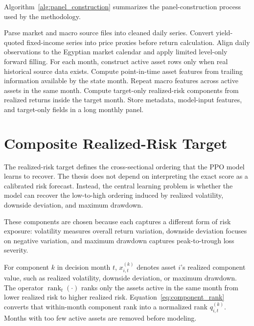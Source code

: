 Algorithm~\ref{alg:panel_construction} summarizes the panel-construction process used by the methodology.

\begin{algorithm}[H]
\caption{Point-in-time monthly panel construction}
\label{alg:panel_construction}
\begin{algorithmic}[1]
\STATE Parse market and macro source files into cleaned daily series.
\STATE Convert yield-quoted fixed-income series into price proxies before return calculation.
\STATE Align daily observations to the Egyptian market calendar and apply limited level-only forward filling.
\STATE For each month, construct active asset rows only when real historical source data exists.
\STATE Compute point-in-time asset features from trailing information available by the state month.
\STATE Repeat macro features across active assets in the same month.
\STATE Compute target-only realized-risk components from realized returns inside the target month.
\STATE Store metadata, model-input features, and target-only fields in a long monthly panel.
\end{algorithmic}
\end{algorithm}

\section{Composite Realized-Risk Target}
\label{sec:composite_risk_target}

The realized-risk target defines the cross-sectional ordering that the PPO model learns to recover. The thesis does not depend on interpreting the exact score as a calibrated risk forecast. Instead, the central learning problem is whether the model can recover the low-to-high ordering induced by realized volatility, downside deviation, and maximum drawdown.

These components are chosen because each captures a different form of risk exposure: volatility measures overall return variation, downside deviation focuses on negative variation, and maximum drawdown captures peak-to-trough loss severity.

For component \(k\) in decision month \(t\), \(x_{i,t}^{(k)}\) denotes asset \(i\)'s realized component value, such as realized volatility, downside deviation, or maximum drawdown. The operator \(\operatorname{rank}_{t}(\cdot)\) ranks only the assets active in the same month from lower realized risk to higher realized risk. Equation~\ref{eq:component_rank} converts that within-month component rank into a normalized rank \(q_{i,t}^{(k)}\). Months with too few active assets are removed before modeling.

